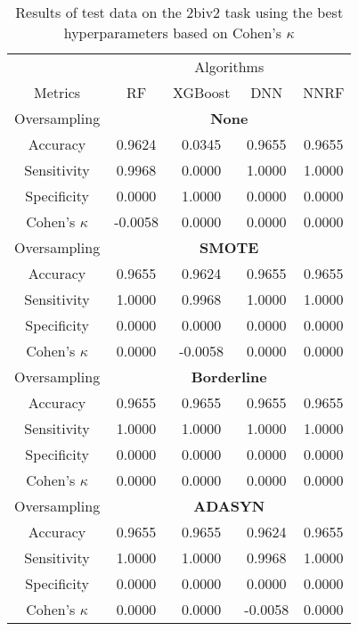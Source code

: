 \begin{table}[!htb]
\centering
\caption{Results of test data on the 2biv2 task using the best hyperparameters based on Cohen's $\kappa$}
\label{tab:2biv2_test_results}
\begin{tabular}{c | c c c c}
\hline
 & \multicolumn{4}{c}{Algorithms}\\ 
Metrics &RF & XGBoost & DNN & NNRF\\ 
\hline
Oversampling &\multicolumn{4}{|c}{\textbf{None}}\\ 
\hline
Accuracy & 0.9624 & 0.0345 & 0.9655 & 0.9655\\ 
Sensitivity & 0.9968 & 0.0000 & 1.0000 & 1.0000\\ 
Specificity & 0.0000 & 1.0000 & 0.0000 & 0.0000\\ 
Cohen's $\kappa$ & -0.0058 & 0.0000 & 0.0000 & 0.0000\\ 
\hline
Oversampling &\multicolumn{4}{|c}{\textbf{SMOTE}}\\ 
\hline
Accuracy & 0.9655 & 0.9624 & 0.9655 & 0.9655\\ 
Sensitivity & 1.0000 & 0.9968 & 1.0000 & 1.0000\\ 
Specificity & 0.0000 & 0.0000 & 0.0000 & 0.0000\\ 
Cohen's $\kappa$ & 0.0000 & -0.0058 & 0.0000 & 0.0000\\ 
\hline
Oversampling &\multicolumn{4}{|c}{\textbf{Borderline}}\\ 
\hline
Accuracy & 0.9655 & 0.9655 & 0.9655 & 0.9655\\ 
Sensitivity & 1.0000 & 1.0000 & 1.0000 & 1.0000\\ 
Specificity & 0.0000 & 0.0000 & 0.0000 & 0.0000\\ 
Cohen's $\kappa$ & 0.0000 & 0.0000 & 0.0000 & 0.0000\\ 
\hline
Oversampling &\multicolumn{4}{|c}{\textbf{ADASYN}}\\ 
\hline
Accuracy & 0.9655 & 0.9655 & 0.9624 & 0.9655\\ 
Sensitivity & 1.0000 & 1.0000 & 0.9968 & 1.0000\\ 
Specificity & 0.0000 & 0.0000 & 0.0000 & 0.0000\\ 
Cohen's $\kappa$ & 0.0000 & 0.0000 & -0.0058 & 0.0000\\ 
\hline
\end{tabular}
\end{table}


